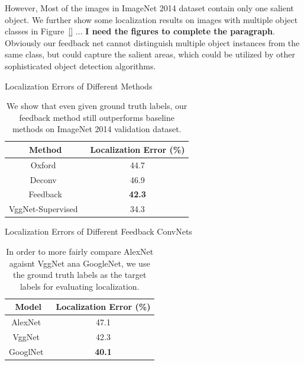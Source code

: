 However, Most of the images in ImageNet 2014 dataset contain only one salient object. We further show some localization results on images with multiple object classes in Figure~\ref{} ... \textbf{\color{red} I need the figures to complete the paragraph}. Obviously our feedback net cannot distinguish multiple object instances from the same class, but could capture the salient areas, which could be utilized by other sophisticated object detection algorithms. 

\begin{table}
\centering
\small
Localization Errors of Different Methods
\begin{tabular}{|c|c|}
\hline
Method & Localization Error (\%) \\ \hline
Oxford~\cite{simonyan2013deep} & 44.7 \\ \hline
Deconv~\cite{zeiler2014visualizing} & 46.9 \\ \hline
Feedback & \textbf{42.3} \\ \hline
VggNet-Supervised~\cite{Simonyan2014Very} & 34.3 \\ \hline
\end{tabular}
\caption{We show that even given ground truth labels, our feedback method still outperforms baseline methods on ImageNet 2014 validation dataset.}
\label{tab:localization_accuracy}
\end{table}

\begin{table}
\centering
\small
Localization Errors of Different Feedback ConvNets
\begin{tabular}{|c|c|}
\hline
Model & Localization Error (\%) \\ \hline 
AlexNet~\cite{Krizhevsky2012ImageNet} & 47.1 \\ \hline
VggNet~\cite{Simonyan2014Very} & 42.3 \\ \hline
GooglNet~\cite{Szegedy2014Going} & \textbf{40.1} \\ \hline
\end{tabular}
\caption{In order to more fairly compare AlexNet agaisnt VggNet ana GoogleNet, we use the ground truth labels as the target labels for evaluating localization.}
\label{tab:localization_model_compare}
\end{table}

